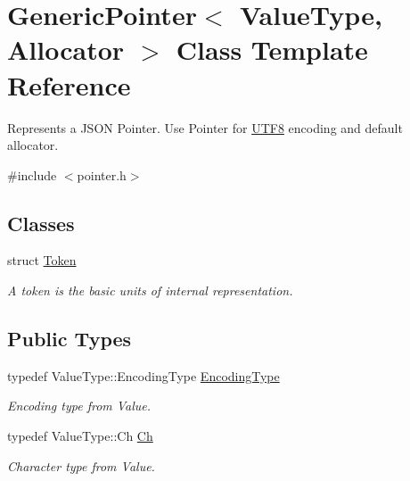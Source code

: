 \hypertarget{a02232}{}\section{Generic\+Pointer$<$ Value\+Type, Allocator $>$ Class Template Reference}
\label{a02232}


Represents a J\+S\+ON Pointer. Use Pointer for \hyperlink{a02144}{U\+T\+F8} encoding and default allocator.  




{\ttfamily \#include $<$pointer.\+h$>$}

\subsection*{Classes}
\begin{DoxyCompactItemize}
\item 
struct \hyperlink{a02308}{Token}
\begin{DoxyCompactList}\small\item\em A token is the basic units of internal representation. \end{DoxyCompactList}\end{DoxyCompactItemize}
\subsection*{Public Types}
\begin{DoxyCompactItemize}
\item 
\mbox{\label{a02232_a4b802da797a7a0b615fd9611cedb7c3b}} 
typedef Value\+Type\+::\+Encoding\+Type \hyperlink{a02232_a4b802da797a7a0b615fd9611cedb7c3b}{Encoding\+Type}
\begin{DoxyCompactList}\small\item\em Encoding type from Value. \end{DoxyCompactList}\item 
\mbox{\label{a02232_ab292356c11b4015c98d21b966b11f285}} 
typedef Value\+Type\+::\+Ch \hyperlink{a02232_ab292356c11b4015c98d21b966b11f285}{Ch}
\begin{DoxyCompactList}\small\item\em Character type from Value. \end{DoxyCompactList}\end{DoxyCompactItemize}
